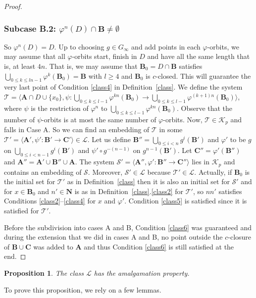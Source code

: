 \documentclass[JEP,XML,SOM,Unicode,NoFloatCountersInSection]{cedram}
\let\mathcal\mathscr
\theoremstyle{plain}
\newtheorem{prop}[thm]{Proposition}
\theoremstyle{definition}
\newcommand{\bA}{{\boldsymbol{A}}}
\newcommand{\bB}{{\boldsymbol{B}}}
\newcommand{\bC}{{\boldsymbol{C}}}
\newcommand{\NN}{\mathbf{N}}
\newcommand{\cK}{\mathcal{K}}
\newcommand{\cL}{\mathcal{L}}
\newcommand{\cS}{\mathcal{S}}
\newcommand{\cT}{\mathcal{T}}
\begin{document}
\begin{proof}
\subsubsection*{Subcase \textup{B.2:} $\varphi^n(D)\cap \bB\neq\emptyset$} So $\varphi^n(D)=D$. Up to choosing $g\in G_\infty$ and add points in each $\varphi$-orbits, we may assume that all $\varphi$-orbits start, finish in $D$ and have all the same length that is, at least $4n$. That is, we may assume that $\bB_0=D\cap\bB$ satisfies $\bigcup_{0\leq k \leq ln-1}\varphi^k(\bB_0)=\bB$ with $l\geq4$ and $\bB_0$ is $c$-closed. This will guarantee the very last point of Condition \eqref{class4} in Definition~\ref{class}. We define the system $\cT=\langle \bA\cap D\cup\{x_0\},\psi\colon\bigcup_{0\leq k \leq l-1}\varphi^{kn}(\bB_0)\to\bigcup_{0\leq k \leq l-1}\varphi^{(k+1)n}(\bB_0)\rangle$, where $\psi$ is the restriction of $\varphi^n$ to $\bigcup_{0\leq k \leq l-1}\varphi^{kn}(\bB_0)$. Observe that the number of $\psi$-orbits is at most the same number of $\varphi$-orbits. Now, $\cT\in \cK_p$ and falls in Case A. So we can find an embedding of $\cT$ in some $\cT'=\langle \bA',\psi'\colon \bB'\to\bC'\rangle\in\cL$. Let us define $\bB''=\bigcup_{0\leq i<n}g^i(\bB')$ and $\varphi'$ to be $g$ on $\bigcup_{0\leq i<n-1}g^i(\bB')$ and $\psi'\circ g^{-(n-1)}$ on $g^{n-1}(\bB')$. Let $\bC''=\varphi'(\bB'')$ and $\bA''=\bA'\cup\bB''\cup\bA$. The system $\cS'=\langle\bA'',\varphi'\colon \bB''\to\bC''\rangle$ lies in $\cK_p$ and contains an embedding of $\cS$. Moreover, $\cS'\in\cL$ because $\cT'\in\cL$. Actually, if $\bB_0$ is the initial set for $\cT'$ as in Definition~\ref{class} then it is also an initial set for $\cS'$ and for $x\in\bB_0$ and $n'\in\NN$ is as in Definition~\ref{class}.\eqref{class2} for $\cT'$, so $nn'$ satisfies Conditions \eqref{class2}--\eqref{class4} for $x$ and $\varphi'$. Condition \eqref{class5} is satisfied since it is satisfied for $\cT'$.

Before the subdivision into cases A and B, Condition \eqref{class6} was guaranteed and during the extension that we did in cases A and B, no point outside the $c$-closure of $\bB\cup\bC$ was added to $\bA$ and thus Condition \eqref{class6} is still satisfied at the end.
\end{proof}

\begin{prop}\label{WAP} The class $\cL$ has the amalgamation property.\end{prop}

To prove this proposition, we rely on a few lemmas.
\end{document}
